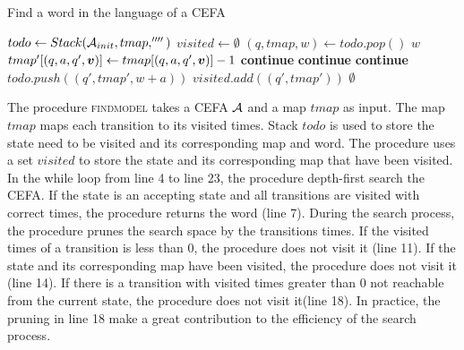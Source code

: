 \begin{algorithm}[t]
  \caption{Find a word in the language of a CEFA}\label{alg:findword}
  \begin{algorithmic}[1]
      \State $todo \gets Stack(\mathcal{A}_{init}, tmap, '''')$
      \State $visited \gets \emptyset$
        \State $(q, tmap, w) \gets todo.pop()$
          \State \Return $w$
        \EndIf
          \State $tmap'[(q, a, q', \myvec{v})] \gets tmap[(q, a, q', \myvec{v})] - 1$
            \State \textbf{continue}
          \EndIf
            \State \textbf{continue}
          \EndIf
            \State \textbf{continue}
          \EndIf
          \State $todo.push((q', tmap', w+a))$
          \State $visited.add((q', tmap'))$
        \EndFor
      \EndWhile
      \State \Return $\emptyset$ 
  \EndProcedure
  \end{algorithmic}
  \end{algorithm}

  The procedure \textsc{findmodel} takes a CEFA $\mathcal{A}$ and a map $tmap$ as input. The map $tmap$ maps each transition to its visited times. Stack $todo$ is used to store the state need to be visited and its corresponding map and word. The procedure uses a set $visited$ to store the state and its corresponding map that have been visited. In the while loop from line 4 to line 23, the procedure depth-first search the CEFA. If the state is an accepting state and all transitions are visited with correct times, the procedure returns the word (line 7). During the search process, the procedure prunes the search space by the transitions times. If the visited times of a transition is less than $0$, the procedure does not visit it (line 11). If the state and its corresponding map have been visited, the procedure does not visit it (line 14). If there is a transition with visited times greater than $0$ not reachable from the current state, the procedure does not visit it(line 18). In practice, the pruning in line 18 make a great contribution to the efficiency of the search process.